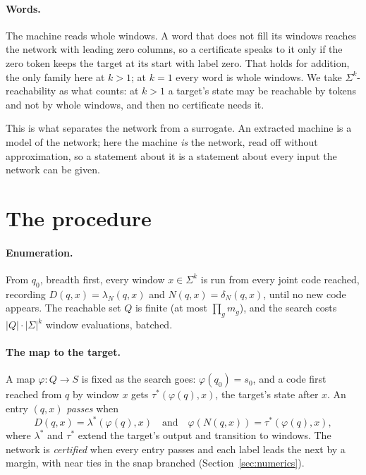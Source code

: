 \documentclass[11pt]{article}
\theoremstyle{definition}
\begin{document}
\paragraph{Words.} The machine reads whole windows. A word that does not fill its windows reaches the
network with leading zero columns, so a certificate speaks to it only if the zero token keeps the
target at its start with label zero. That holds for addition, the only family here at $k > 1$; at $k = 1$
every word is whole windows. We take $\Sigma^k$-reachability as what counts: at $k > 1$ a target's state
may be reachable by tokens and not by whole windows, and then no certificate needs it.

This is what separates the network from a surrogate. An extracted machine is a model of the network;
here the machine \emph{is} the network, read off without approximation, so a statement about it is a
statement about every input the network can be given.

\section{The procedure}
\label{sec:procedure}

\paragraph{Enumeration.} From $q_0$, breadth first, every window $x \in \Sigma^k$ is run from every
joint code reached, recording $D(q, x) = \lambda_N(q, x)$ and $N(q, x) = \delta_N(q, x)$, until no new
code appears. The reachable set $Q$ is finite (at most $\prod_g m_g$), and the search costs
$|Q| \cdot |\Sigma|^k$ window evaluations, batched.

\paragraph{The map to the target.} A map $\varphi : Q \to S$ is fixed as the search goes:
$\varphi(q_0) = s_0$, and a code first reached from $q$ by window $x$ gets
$\tau^\ast(\varphi(q), x)$, the target's state after $x$. An entry $(q, x)$ \emph{passes} when
\[
D(q, x) = \lambda^\ast(\varphi(q), x) \quad\text{and}\quad \varphi(N(q, x)) = \tau^\ast(\varphi(q), x),
\]
where $\lambda^\ast$ and $\tau^\ast$ extend the target's output and transition to windows. The network
is \emph{certified} when every entry passes and each label leads the next by a margin, with near ties
in the snap branched (Section~\ref{sec:numerics}).
\end{document}

